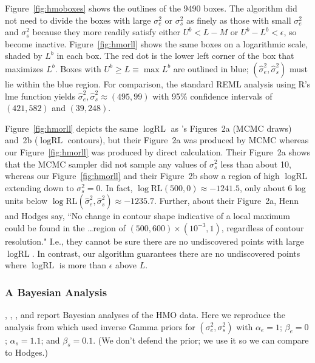\documentclass{report}
\newcommand{\textcompute}{\textsf}
\newcommand{\R}{\textcompute{R}\xspace}
\newcommand{\RLorig}{\text{RL}}
\newcommand{\logRLorig}{\log\RLorig}
\newcommand{\sigssq}{\sigma_s^2}
\newcommand{\sigesq}{\sigma_e^2}
\newcommand{\sshat}{\hat\sigma^2_e,\hat\sigma^2_s}
\begin{document}
Figure~\ref{fig:hmoboxes} shows the outlines of the 9490 boxes.  The algorithm did not need to divide the boxes with large $\sigesq$ or $\sigssq$ as finely as those with small $\sigesq$ and $\sigssq$ because they more readily satisfy either $U^b < L-M$ or $U^b - L^b < \epsilon$, so become inactive.  Figure~\ref{fig:hmorll} shows the same boxes on a logarithmic scale, shaded by $L^b$ in each box.  The red dot is the lower left corner of the box that maximizes $L^b$.  Boxes with $U^b \ge L \equiv \max L^b$ are outlined in blue; $(\sshat)$ must lie within the blue region.  
For comparison, the standard REML analysis using \R's \textcompute{lme} function yields $\sshat \approx (495, 99)$ with 95\% confidence intervals of $(421, 582)$ and $(39, 248)$.

Figure~\ref{fig:hmorll} depicts the same $\logRLorig$ as \cite{henn&hodges:2014}'s Figures~2a (MCMC draws) and~2b ($\logRLorig$ contours), but their Figure~2a was produced by MCMC whereas our Figure~\ref{fig:hmorll} was produced by direct calculation.  Their Figure~2a shows that the MCMC sampler did not sample any values of $\sigssq$ less than about 10, whereas our Figure~\ref{fig:hmorll} and their Figure~2b show a region of high $\logRLorig$ extending down to $\sigssq=0$.  In fact, $\logRLorig(500,0) \approx -1241.5$, only about 6 log units below $\logRLorig(\sshat) \approx -1235.7$.  Further, about their Figure~2a, Henn and Hodges say, ``No change in contour shape indicative of a local maximum could be found in the \dots region of $(500, 600) \times (10^{-3}, 1)$, regardless of contour resolution."  I.e., they cannot be sure there are no undiscovered points with large $\logRLorig$.  In contrast, our algorithm guarantees there are no undiscovered points where $\logRLorig$ is more than $\epsilon$ above $L$.

\subsubsection{A Bayesian Analysis}
 \cite{hodges:98}, \cite{wakefield:1998}, \cite{hodges:2013}, and \cite{henn&hodges:2014} report  Bayesian analyses of the HMO data.  Here we reproduce the analysis from \cite{hodges:98} which used inverse Gamma priors for $(\sigesq,\sigssq)$ with $\alpha_e = 1$; $\beta_e = 0$; $\alpha_s = 1.1$; and $\beta_s =0.1$.  (We don't defend the prior; we use it so we can compare to Hodges.)
\end{document}

